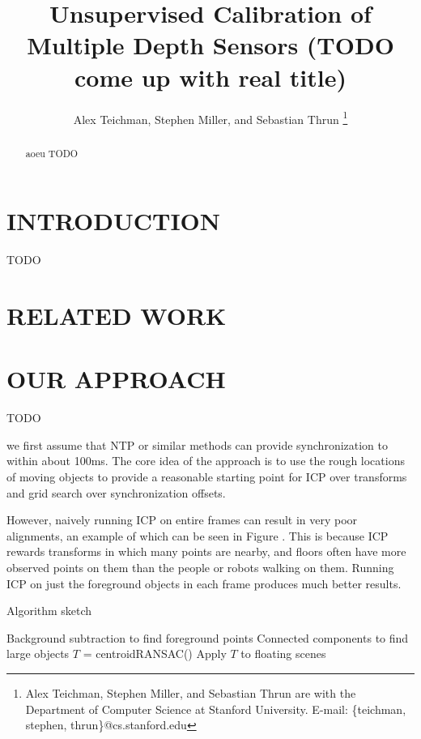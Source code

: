 \documentclass[letterpaper, 10 pt, conference]{ieeeconf}  %
\title{\LARGE \bf
Unsupervised Calibration of Multiple Depth Sensors (TODO come up with real title)}
\author{Alex Teichman, Stephen Miller, and Sebastian Thrun
\thanks{Alex Teichman, Stephen Miller, and Sebastian Thrun are with the Department of Computer Science at Stanford University. \newline E-mail: \{teichman, stephen, thrun\}@cs.stanford.edu } }
\begin{document}
\maketitle
\thispagestyle{empty}
\pagestyle{empty}


\begin{abstract}
aoeu
TODO
\end{abstract}


\section{INTRODUCTION}

TODO

\section{RELATED WORK}


\section{OUR APPROACH}
TODO




 we first assume that NTP or similar methods can provide synchronization to within about 100ms.  The core idea of the approach is to use the rough locations of moving objects to provide a reasonable starting point for ICP over transforms and grid search over synchronization offsets.

However, naively running ICP on entire frames can result in very poor alignments, an example of which can be seen in Figure .  This is because ICP rewards transforms in which many points are nearby, and floors often have more observed points on them than the people or robots walking on them.  Running ICP on just the foreground objects in each frame produces much better results.


\begin{algorithm}
  \caption{Algorithm sketch}
  \label{alg:sketch}
  \SetLine
  \phantom{\;}
  Background subtraction to find foreground points\;
  Connected components to find large objects\;
  $T$ = centroidRANSAC()\;
  Apply $T$ to floating scenes\;
\end{algorithm}
\end{document}
